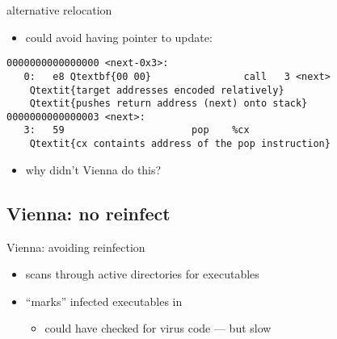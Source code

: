 \begin{frame}[fragile,label=altVirusReloc]{alternative relocation}
    \begin{itemize}
    \item could avoid having pointer to update:
    \end{itemize}
\begin{Verbatim}[fontsize=\fontsize{10}{11}\selectfont,commandchars=Q\{\}]
0000000000000000 <next-0x3>:
   0:   e8 Qtextbf{00 00}                call   3 <next>
    Qtextit{target addresses encoded relatively}
    Qtextit{pushes return address (next) onto stack}
0000000000000003 <next>:
   3:   59                      pop    %cx
    Qtextit{cx containts address of the pop instruction}
\end{Verbatim}
    \begin{itemize}
    \item why didn't Vienna do this?
    \end{itemize}
\end{frame}

\subsection{Vienna: no reinfect}


\begin{frame}{Vienna: avoiding reinfection}
\begin{itemize}
\item scans through active directories for executables
\item ``marks'' infected executables in 
\begin{itemize}
    \item could have checked for virus code --- but slow
\end{itemize}
\end{itemize}
\end{frame}

